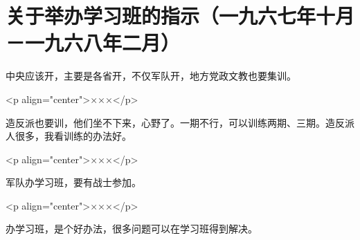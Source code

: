 \section[关于举办学习班的指示（一九六七年十月－一九六八年二月）]{关于举办学习班的指示（一九六七年十月－一九六八年二月）}


中央应该开，主要是各省开，不仅军队开，地方党政文教也要集训。

<p align="center">×××</p>

造反派也要训，他们坐不下来，心野了。一期不行，可以训练两期、三期。造反派人很多，我看训练的办法好。

<p align="center">×××</p>

军队办学习班，要有战士参加。

<p align="center">×××</p>

办学习班，是个好办法，很多问题可以在学习班得到解决。




